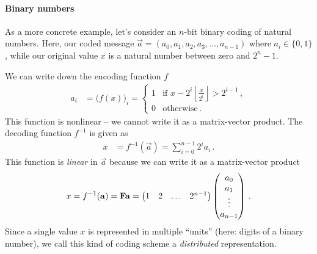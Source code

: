 \documentclass[10pt,letterpaper,oneside]{article}
\begin{document}
\paragraph{Binary numbers}
As a more concrete example, let's consider an $n$-bit binary coding of natural numbers. Here, our coded message $\vec a = (a_0, a_1, a_2, a_3, \ldots, a_{n - 1})$ where $a_i \in \{0, 1\}$, while our original value $x$ is a natural number between zero and $2^n - 1$.

We can write down the encoding function $f$
\begin{align*}
	a_i &= \big(f(x)\big)_i = \begin{cases}
		1 & \text{if } x - 2^i \left\lfloor \frac{x}{2^i} \right\rfloor > 2^{i - 1} \,,\\
		0 & \text{otherwise} \,.
	\end{cases}
\end{align*}
This function is nonlinear -- we cannot write it as a matrix-vector product. The decoding function $f^{-1}$ is given as
\begin{align*}
	x &= f^{-1}(\vec a) = \sum_{i=0}^{n -1} 2^i a_i \,.
\end{align*}
This function is \emph{linear} in $\vec a$ because we can write it as a matrix-vector product
\begin{align*}
x = f^{-1}({\mathbf{a}}) = {{\mathbf{F}}} {\mathbf{a}} = \begin{pmatrix} 1 & 2 & \ldots & 2^{n - 1}\end{pmatrix} \begin{pmatrix} a_0 \\ a_1 \\ \vdots \\ a_{n - 1} \end{pmatrix} \,.
\end{align*}
Since a single value $x$ is represented in multiple \enquote{units} (here: digits of a binary number), we call this kind of coding scheme a \emph{distributed} representation.

\end{document}
